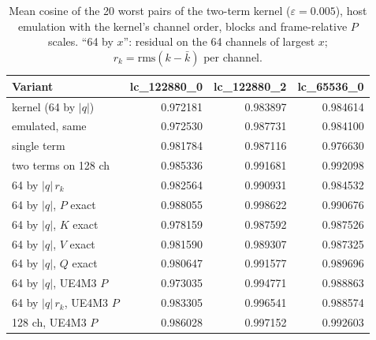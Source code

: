 \documentclass[10pt,twocolumn]{article}
\newcommand{\eps}{\varepsilon}
\begin{document}
\begin{table}[t]
\centering\scriptsize
\setlength{\tabcolsep}{1.5pt}
\begin{tabular}{@{}lrrr@{}}
\toprule
Variant & lc\_122880\_0 & lc\_122880\_2 & lc\_65536\_0 \\
\midrule
kernel (64 by $|q|$) & 0.972181 & 0.983897 & 0.984614 \\
emulated, same & 0.972530 & 0.987731 & 0.984100 \\
single term & 0.981784 & 0.987116 & 0.976630 \\
two terms on 128 ch & 0.985336 & 0.991681 & 0.992098 \\
64 by $|q|\,r_k$ & 0.982564 & 0.990931 & 0.984532 \\
64 by $|q|$, $P$ exact & 0.988055 & 0.998622 & 0.990676 \\
64 by $|q|$, $K$ exact & 0.978159 & 0.987592 & 0.987526 \\
64 by $|q|$, $V$ exact & 0.981590 & 0.989307 & 0.987325 \\
64 by $|q|$, $Q$ exact & 0.980647 & 0.991577 & 0.989696 \\
64 by $|q|$, UE4M3 $P$ & 0.973035 & 0.994771 & 0.988863 \\
64 by $|q|\,r_k$, UE4M3 $P$ & 0.983305 & 0.996541 & 0.988574 \\
128 ch, UE4M3 $P$ & 0.986028 & 0.997152 & 0.992603 \\
\bottomrule
\end{tabular}
\caption{Mean cosine of the 20 worst pairs of the two-term kernel ($\eps=0.005$), host emulation with the kernel's
channel order, blocks and frame-relative $P$ scales. ``64 by $x$'': residual on the 64 channels of largest $x$;
$r_k=\mathrm{rms}(k-\bar k)$ per channel.}
\label{tab:qerr2}
\end{table}
\end{document}
